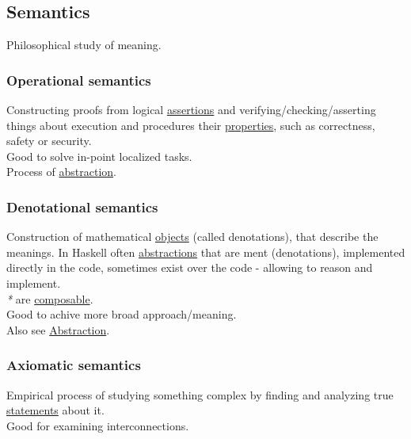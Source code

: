\documentclass[11pt]{article}
\begin{document}
\subsection{\label{org2f919bf}Semantics}
\label{sec:org20ee349}
Philosophical study of meaning.\\

\subsubsection{\label{org3215c38}Operational semantics}
\label{sec:orgbf67e91}
Constructing proofs from logical \hyperref[orgdeb8519]{assertions} and verifying/checking/asserting things about execution and procedures their \hyperref[org763ad6b]{properties}, such as correctness, safety or security.\\

Good to solve in-point localized tasks.\\

Process of \hyperref[orgd787547]{abstraction}.\\

\subsubsection{\label{orgb3318ba}Denotational semantics}
\label{sec:org6ea7ced}
Construction of mathematical \hyperref[orge0f000f]{objects} (called denotations), that describe the meanings. In Haskell often \hyperref[orgabcd7a1]{abstractions} that are ment (denotations), implemented directly in the code, sometimes exist over the code - allowing to reason and implement.\\

\emph{*} are \hyperref[org37ac081]{composable}.\\

Good to achive more broad approach/meaning.\\

Also see \hyperref[orgd787547]{Abstraction}.\\

\subsubsection{\label{org382e9d6}Axiomatic semantics}
\label{sec:org70981f5}
Empirical process of studying something complex by finding and analyzing true \hyperref[org3a604a1]{statements} about it.\\

Good for examining interconnections.\\
\end{document}

